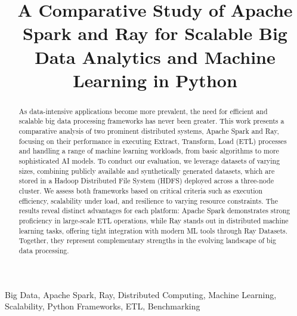 \documentclass[conference]{IEEEtran}
\begin{document}
\title{A Comparative Study of Apache Spark and Ray for
Scalable Big Data Analytics and Machine Learning in Python}

\author{
    
  \and

}

\maketitle

\begin{abstract}
As data-intensive applications become more prevalent, the need for
efficient and scalable big data processing frameworks has never been greater.
This work presents a comparative analysis of two prominent distributed systems, Apache Spark and
Ray, focusing on their performance in executing Extract, Transform, Load (ETL) processes and
handling a range of machine learning workloads, from basic algorithms to more sophisticated
AI models. To conduct our evaluation, we leverage datasets of varying sizes, combining publicly available 
and synthetically generated datasets, which are stored in a Hadoop Distributed File System (HDFS) deployed
across a three-node cluster. We assess both frameworks based on critical criteria such as
execution efficiency, scalability under load, and resilience to varying resource constraints.
The results reveal distinct advantages for each platform: Apache Spark demonstrates strong
proficiency in large-scale ETL operations, while Ray stands out in distributed machine
learning tasks, offering tight integration with modern ML tools through Ray Datasets.
Together, they represent complementary strengths in the evolving landscape of
big data processing.
\end{abstract}

\begin{IEEEkeywords}
Big Data, Apache Spark, Ray, Distributed Computing, Machine Learning, Scalability,
Python Frameworks, ETL, Benchmarking
\end{IEEEkeywords}
\end{document}

